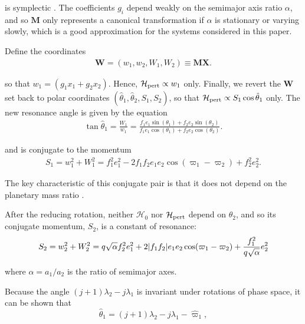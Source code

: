 \documentclass[usenatbib,twocolumn]{mnras}
\renewcommand{\v}[1]{\boldsymbol{ #1 }}
\DeclarePairedDelimiter{\abs}{|}{|}
\begin{document}
\noindent is symplectic \citep{goldstein_classical_2000}.
The coefficients \(g_i\) depend weakly on the semimajor axis ratio
\(\alpha\), and so \(\v M\) only represents a canonical transformation if
\(\alpha\) is stationary or varying slowly, which is a good
approximation for the systems considered in this paper.

Define the coordinates
\begin{align}
   \v W = (w_1, w_2, W_1, W_2) \equiv \v M \v X.
\end{align}

\noindent so that \(w_1 = (g_1 x_1 + g_2 x_2)\).  Hence,
\(\mathcal H_{\rm pert}\propto w_1\) only.  Finally, we revert the \(\v
W\) set back to polar coordinates
\((\hat\theta_1,\hat\theta_2,S_1,S_2)\), so that \(\mathcal H_{\rm pert}\propto S_1\cos\hat\theta_1\)
only.
The new resonance angle is
given by the equation
\begin{align}
\label{hattheta}
  \tan\hat{\theta}_1 = \frac{W_1}{w_1} = \frac{f_1 e_1\sin(\theta_1)
  + f_2e_2\sin(\theta_2)}{f_1e_1\cos(\theta_1) + f_2e_2\cos(\theta_2)}.
\end{align}

\noindent
and is conjugate to the momentum
\begin{align}
  S_1 = w_1^2 + W_1^2 = f_1^2e_1^2
  - 2f_1f_2e_1e_2\cos(\varpi_1 - \varpi_2) + f_2^2e_2^2.
\end{align}

\noindent
The key characteristic of this conjugate pair is that it does not depend
on the planetary mass ratio \citep[e.g.][]{deck13_first_order_reson_overl_stabil}.

After the reducing rotation, neither \(\mathcal H_0\) nor \(\mathcal
H_{\rm pert}\) depend on \(\hat\theta_2\), and so its conjugate momentum,
\(S_2\), is a constant of resonance:
\begin{align}
\label{eq:appS2deriv}
  S_2 = w_2^2 + W_2^2 = q\sqrt{\alpha}f_2^2e_1^2
+2\abs{f_1f_2}e_1e_2\cos(\varpi_1-\varpi_2) + \frac{f_1^2}{q\sqrt\alpha}e_2^2
\end{align}

\noindent
where \(\alpha=a_1/a_2\) is the ratio of semimajor axes.

Because the angle \((j+1)\lambda_2-j\lambda_1\) is
invariant under rotations of phase space,
it can be shown that
\begin{equation}
  \hat{\theta}_1 = (j+1)\lambda_2-j\lambda_1
  - \hat\varpi_1,
\end{equation}
\end{document}
